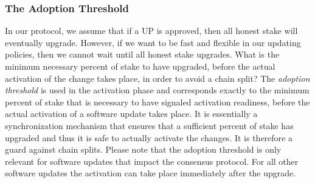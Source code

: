 

\subsubsection{The Adoption Threshold}
In our protocol, we assume that if a UP is approved, then all honest stake will eventually upgrade. However, if we want to be fast and flexible in our updating policies, then we cannot wait until all honest stake upgrades. What is the minimum necessary percent of stake to have upgraded, before the actual activation of the change takes place, in order to avoid a chain split? The \emph{adoption threshold} is used in the activation phase and corresponds exactly to the minimum percent of stake that is necessary to have signaled activation readiness, before the actual activation of a software update takes place. It is essentially a synchronization mechanism that ensures that a sufficient percent of stake has upgraded and thus it is safe to actually activate the changes. It is therefore a guard against chain splits. Please note that the adoption threshold is only relevant for software updates that impact the consensus protocol. For all other software updates the activation can take place immediately after the upgrade.

